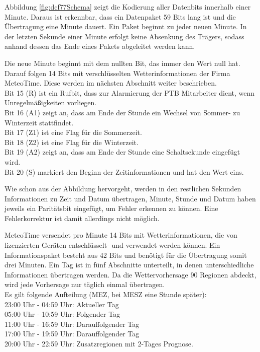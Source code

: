 \documentclass[a4paper,11pt]{article}
\newcounter{subsubsubsection}[subsubsection]
\begin{document}
\noindent
Abbildung \ref{fig:dcf77Schema} zeigt die Kodierung aller Datenbits innerhalb einer Minute. Daraus ist erkennbar, dass ein Datenpaket 59 Bits lang ist und
die Übertragung eine Minute dauert. Ein Paket beginnt zu jeder neuen Minute. In der letzten Sekunde einer Minute erfolgt keine Absenkung des Trägers, sodass anhand dessen
das Ende eines Pakets abgeleitet werden kann. 

\vspace{0.2cm}
\noindent
Die neue Minute beginnt mit dem nullten Bit, das immer den Wert null hat. Darauf folgen 14 Bits mit verschlüsselten Wetterinformationen der Firma MeteoTime.
Diese werden im nächsten Abschnitt weiter beschrieben. \\
Bit 15 (R) ist ein Rufbit, dass zur Alarmierung der PTB Mitarbeiter dient, wenn Unregelmäßigkeiten vorliegen. \\
Bit 16 (A1) zeigt an, dass am Ende der Stunde ein Wechsel von Sommer- zu Winterzeit stattfindet. \\
Bit 17 (Z1) ist eine Flag für die Sommerzeit. \\
Bit 18 (Z2) ist eine Flag für die Winterzeit. \\
Bit 19 (A2) zeigt an, dass am Ende der Stunde eine Schaltsekunde eingefügt wird. \\
Bit 20 (S) markiert den Beginn der Zeitinformationen und hat den Wert eins. 

\vspace{0.2cm}
\noindent
Wie schon aus der Abbildung hervorgeht, werden in den restlichen Sekunden Informationen zu Zeit und Datum übertragen, Minute, Stunde und Datum haben jeweils ein
Paritätsbit eingefügt, um Fehler erkennen zu können. Eine Fehlerkorrektur ist damit allerdings nicht möglich. 

\label{subsubsubsub:meteotime}

MeteoTime versendet pro Minute 14 Bits mit Wetterinformationen, die von lizenzierten Geräten entschlüsselt- und verwendet werden können. 
Ein Informationspaket besteht aus 42 Bits und benötigt für die Übertragung somit drei Minuten. Ein Tag ist in fünf Abschnitte unterteilt, in denen
unterschiedliche Informationen übertragen werden. Da die Wettervorhersage 90 Regionen abdeckt, wird jede Vorhersage nur täglich einmal übertragen. \\
Es gilt folgende Aufteilung (MEZ, bei MESZ eine Stunde später): \\
23:00 Uhr - 04:59 Uhr: Aktueller Tag \\
05:00 Uhr - 10:59 Uhr: Folgender Tag \\
11:00 Uhr - 16:59 Uhr: Darauffolgender Tag \\
17:00 Uhr - 19:59 Uhr: Darauffolgender Tag \\
20:00 Uhr - 22:59 Uhr: Zusatzregionen mit 2-Tages Prognose. 
\end{document}
